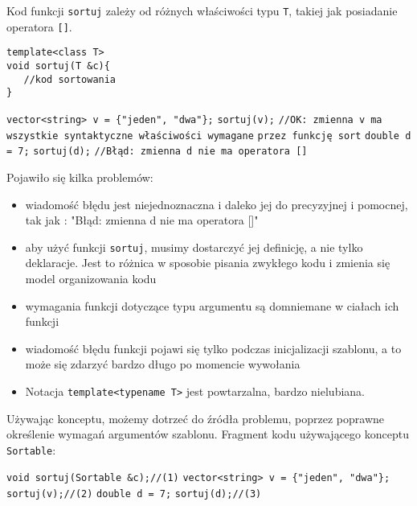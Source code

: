 \documentclass[11pt, a4paper]{article}
\begin{document}
Kod funkcji \verb#sortuj# zależy od różnych właściwości typu \verb#T#, takiej jak posiadanie operatora \verb#[]#.
\newpage

\begin{lstlisting}[frame=single]
template<class T>
void sortuj(T &c){
   //kod sortowania
}
\end{lstlisting}

\noindent \verb#vector<string> v = {"jeden", "dwa"};# \newline
\verb#sortuj(v);# \newline
\verb#//OK: zmienna v ma wszystkie syntaktyczne właściwości wymagane# \newline
\verb#przez funkcję sort# \newline\newline
\verb#double d = 7;# \newline
\verb#sortuj(d);# \newline
\verb#//Błąd: zmienna d nie ma operatora []#\newline

\noindent Pojawiło się kilka problemów:
\begin{itemize}

\item wiadomość błędu jest niejednoznaczna i daleko jej do precyzyjnej i pomocnej, tak jak : "Błąd: zmienna d nie ma operatora []"

\item aby użyć funkcji \verb#sortuj#, musimy dostarczyć jej definicję, a nie tylko deklaracje. Jest to różnica w sposobie pisania zwykłego kodu i zmienia się model organizowania kodu

\item wymagania funkcji dotyczące typu argumentu są domniemane w ciałach ich funkcji

\item wiadomość błędu funkcji pojawi się tylko podczas inicjalizacji szablonu, a to może się zdarzyć bardzo długo po momencie wywołania

\item Notacja \verb#template<typename T># jest powtarzalna, bardzo nielubiana.

\end{itemize}

Używając konceptu, możemy dotrzeć do źródła problemu, poprzez poprawne określenie wymagań argumentów szablonu. Fragment kodu używającego konceptu \verb#Sortable#:\newline

\noindent \verb#void sortuj(Sortable &c);//(1)#\newline
\verb#vector<string> v = {"jeden", "dwa"};#\newline
\verb#sortuj(v);//(2)# \newline
\verb#double d = 7;# \newline
\verb#sortuj(d);//(3)# \newline
\end{document}
